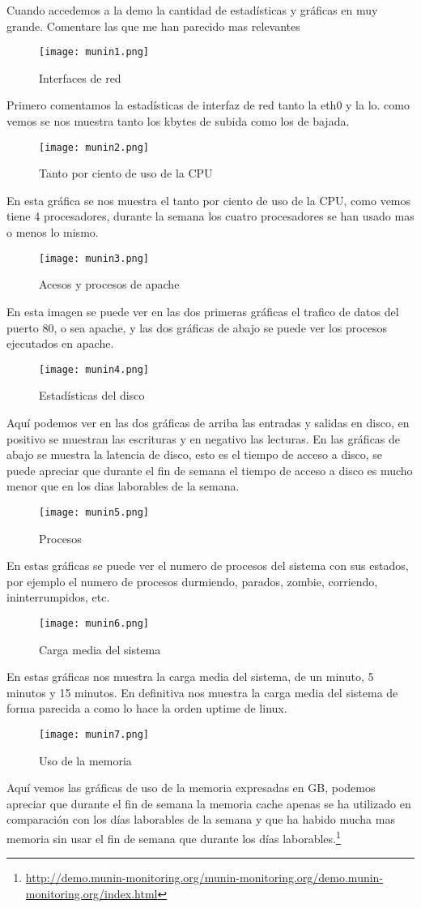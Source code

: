 Cuando accedemos a la demo la cantidad de estadísticas y gráficas en muy grande. Comentare las que me han parecido mas relevantes
\begin{figure}[H] 
\centering
\texttt{[image: munin1.png]}  
\label{figura17:}
\caption{Interfaces de red}
\end{figure}
Primero comentamos la estadísticas de interfaz de red tanto la eth0 y la lo. como vemos se nos muestra tanto los kbytes de subida como los de bajada.
\begin{figure}[H] 
\centering
\texttt{[image: munin2.png]}  
\label{figura18:}
\caption{Tanto por ciento de uso de la CPU}
\end{figure}
En esta gráfica se nos muestra el tanto por ciento de uso de la CPU, como vemos tiene 4 procesadores, durante la semana los cuatro procesadores se han usado mas o menos lo mismo.
\begin{figure}[H] 
\centering
\texttt{[image: munin3.png]}  
\label{figura19:}
\caption{Acesos y procesos de apache}
\end{figure}
En esta imagen se puede ver en las dos primeras gráficas el trafico de datos del puerto 80, o sea apache, y las dos gráficas de abajo se puede ver los procesos ejecutados en apache.
\begin{figure}[H] 
\centering
\texttt{[image: munin4.png]}  
\label{figura20:}
\caption{Estadísticas del disco}
\end{figure}
Aquí podemos ver en las dos gráficas de arriba las entradas y salidas en disco, en positivo se muestran las escrituras y en negativo las lecturas.
En las gráficas de abajo se muestra la latencia de disco, esto es el tiempo de acceso a disco, se puede apreciar que durante el fin de semana el tiempo de acceso a disco es mucho menor que en los dias laborables de la semana.
\begin{figure}[H] 
\centering
\texttt{[image: munin5.png]}  
\label{figura21:}
\caption{Procesos}
\end{figure}
En estas gráficas se puede ver el numero de procesos del sistema con sus estados, por ejemplo el numero de procesos durmiendo, parados, zombie, corriendo, ininterrumpidos, etc.
\begin{figure}[H] 
\centering
\texttt{[image: munin6.png]}  
\label{figura22:}
\caption{Carga media del sistema}
\end{figure}
En estas gráficas nos muestra la carga media del sistema, de un minuto, 5 minutos y 15 minutos. En definitiva nos muestra la carga media del sistema de forma parecida a como lo hace la orden uptime de linux.
\begin{figure}[H] 
\centering
\texttt{[image: munin7.png]}  
\label{figura23:}
\caption{Uso de la memoria}
\end{figure}
Aquí vemos las gráficas de uso de la memoria expresadas en GB, podemos apreciar que durante el fin de semana la memoria cache apenas se ha utilizado en comparación con los días laborables de la semana y que ha habido mucha mas memoria sin usar el fin de semana que durante los días laborables.\footnote{\url{http://demo.munin-monitoring.org/munin-monitoring.org/demo.munin-monitoring.org/index.html}}
